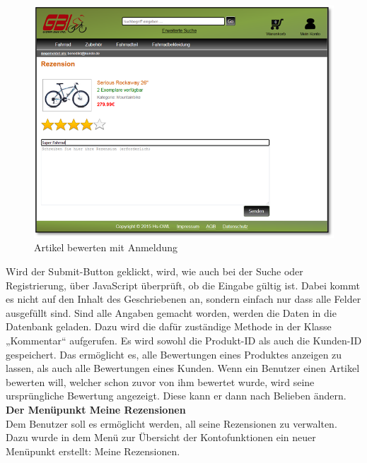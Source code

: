 \begin{figure}[H]
\begin{center}
\includegraphics[width=12cm]{Bilder/Michael_Abbildung12-ArtikelBewertenMitAnmeldung.png}
\end{center}
\caption{Artikel bewerten mit Anmeldung}
\end{figure}

\newpage
Wird der Submit-Button geklickt, wird, wie auch bei der Suche oder Registrierung, über JavaScript überprüft, ob die Eingabe gültig ist. Dabei kommt es nicht auf den Inhalt des Geschriebenen an, sondern einfach nur dass alle Felder ausgefüllt sind. Sind alle Angaben gemacht worden, werden die Daten in die Datenbank geladen. Dazu wird die dafür zuständige Methode in der Klasse „Kommentar“ aufgerufen. Es wird sowohl die Produkt-ID als auch die Kunden-ID gespeichert. Das ermöglicht es, alle Bewertungen eines Produktes anzeigen zu lassen, als auch alle Bewertungen eines Kunden. Wenn ein Benutzer einen Artikel bewerten will, welcher schon zuvor von ihm bewertet wurde, wird seine ursprüngliche Bewertung angezeigt. Diese kann er dann nach Belieben ändern.\\

\textbf{Der Menüpunkt \glqq Meine Rezensionen\grqq{}}
\\
Dem Benutzer soll es ermöglicht werden, all seine Rezensionen zu verwalten. Dazu wurde in dem Menü zur Übersicht der Kontofunktionen ein neuer Menüpunkt erstellt: Meine Rezensionen. 


